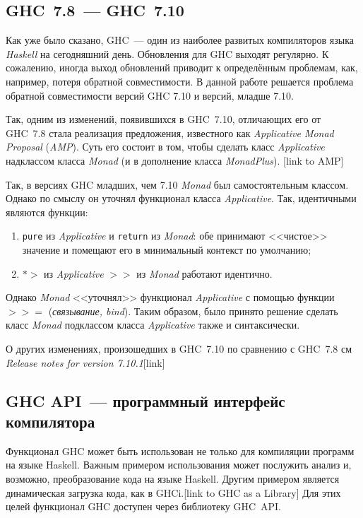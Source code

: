 \subsection{GHC~7.8~--- GHC~7.10}\label{710}
Как уже было сказано, GHC~--- один из наиболее развитых компиляторов языка \textit{Haskell} на сегодняшний день. Обновления для GHC выходят регулярно. К сожалению, иногда выход обновлений приводит к определённым проблемам, как, например, потеря обратной совместимости. В данной работе решается проблема обратной совместимости версий GHC 7.10 и версий, младше 7.10.

Так, одним из изменений, появившихся в GHC~7.10, отличающих его от GHC~7.8 стала реализация предложения, известного как \textit{Applicative Monad Proposal} (\textit{AMP}). Суть его состоит в том, чтобы сделать класс \textit{Applicative} надклассом класса \textit{Monad} (и в дополнение класса \textit{MonadPlus}). [link to AMP] 

Так, в версиях GHC младших, чем 7.10 \textit{Monad} был самостоятельным классом. Однако по смыслу он уточнял функционал класса \textit{Applicative}. Так, идентичными являются функции:
\begin{enumerate}[1)]
\item \lstinline{pure} из \textit{Applicative} и \lstinline{return} из \textit{Monad}: обе принимают <<чистое>> значение и помещают его в минимальный контекст по умолчанию;
\item \textbf{$*>$} из \textit{Applicative} \textbf{$>>$} из \textit{Monad} работают идентично.
\end{enumerate}
Однако \textit{Monad} <<уточнял>> функционал \textit{Applicative} с помощью функции \textbf{$>>=$} (\textit{связывание, bind}). Таким образом, было принято решение сделать класс \textit{Monad} подклассом класса \textit{Applicative} также и синтаксически.

О других изменениях, произошедших в GHC~7.10 по сравнению с GHC~7.8 см \textit{Release notes for version 7.10.1}[link]


\subsection{GHC API~--- программный интерфейс компилятора}\label{ghcapi}
Функционал GHC может быть использован не только для компиляции программ на языке Haskell. Важным примером использования может послужить анализ и, возможно, преобразование кода на языке Haskell. Другим примером является динамическая загрузка кода, как в GHCi.[link to GHC as a Library] Для этих целей функционал GHC доступен через библиотеку GHC~API.

